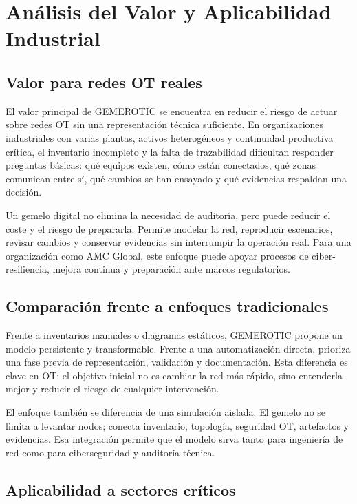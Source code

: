 \chapter{Análisis del Valor y Aplicabilidad Industrial} \label{ch:valor-aplicabilidad}

\section{Valor para redes OT reales} \label{sec:valor-redes-reales}

El valor principal de GEMEROTIC se encuentra en reducir el riesgo de actuar sobre redes OT sin una representación técnica suficiente. En organizaciones industriales con varias plantas, activos heterogéneos y continuidad productiva crítica, el inventario incompleto y la falta de trazabilidad dificultan responder preguntas básicas: qué equipos existen, cómo están conectados, qué zonas comunican entre sí, qué cambios se han ensayado y qué evidencias respaldan una decisión.

Un gemelo digital no elimina la necesidad de auditoría, pero puede reducir el coste y el riesgo de prepararla. Permite modelar la red, reproducir escenarios, revisar cambios y conservar evidencias sin interrumpir la operación real. Para una organización como AMC Global, este enfoque puede apoyar procesos de ciber-resiliencia, mejora continua y preparación ante marcos regulatorios.

\section{Comparación frente a enfoques tradicionales} \label{sec:comparacion-enfoques}

Frente a inventarios manuales o diagramas estáticos, GEMEROTIC propone un modelo persistente y transformable. Frente a una automatización directa, prioriza una fase previa de representación, validación y documentación. Esta diferencia es clave en OT: el objetivo inicial no es cambiar la red más rápido, sino entenderla mejor y reducir el riesgo de cualquier intervención.

El enfoque también se diferencia de una simulación aislada. El gemelo no se limita a levantar nodos; conecta inventario, topología, seguridad OT, artefactos y evidencias. Esa integración permite que el modelo sirva tanto para ingeniería de red como para ciberseguridad y auditoría técnica.

\section{Aplicabilidad a sectores críticos} \label{sec:sectores-criticos}

